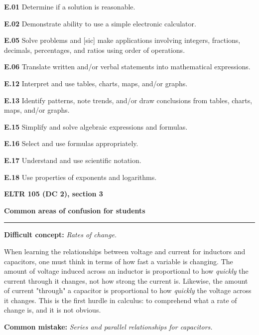 \item{\bf E.01} Determine if a solution is reasonable.
\item{\bf E.02} Demonstrate ability to use a simple electronic calculator.
\item{\bf E.05} Solve problems and [sic] make applications involving integers, fractions, decimals, percentages, and ratios using order of operations.
\item{\bf E.06} Translate written and/or verbal statements into mathematical expressions.
\item{\bf E.12} Interpret and use tables, charts, maps, and/or graphs.
\item{\bf E.13} Identify patterns, note trends, and/or draw conclusions from tables, charts, maps, and/or graphs.
\item{\bf E.15} Simplify and solve algebraic expressions and formulas.
\item{\bf E.16} Select and use formulas appropriately.
\item{\bf E.17} Understand and use scientific notation.
\item{\bf E.18} Use properties of exponents and logarithms.
\medskip





\vfil \eject

\centerline{\bf ELTR 105 (DC 2), section 3} \bigskip 
 
\vskip 10pt

\noindent
{\bf Common areas of confusion for students}

\vskip 5pt

\hrule \vskip 5pt

\vskip 10pt

\noindent
{\bf Difficult concept: } {\it Rates of change.}

When learning the relationships between voltage and current for inductors and capacitors, one must think in terms of how fast a variable is changing.  The amount of voltage induced across an inductor is proportional to how {\it quickly} the current through it changes, not how strong the current is.  Likewise, the amount of current "through" a capacitor is proportional to how {\it quickly} the voltage across it changes.  This is the first hurdle in calculus: to comprehend what a rate of change is, and it is not obvious.

\vskip 10pt

\noindent
{\bf Common mistake: } {\it Series and parallel relationships for capacitors.}


